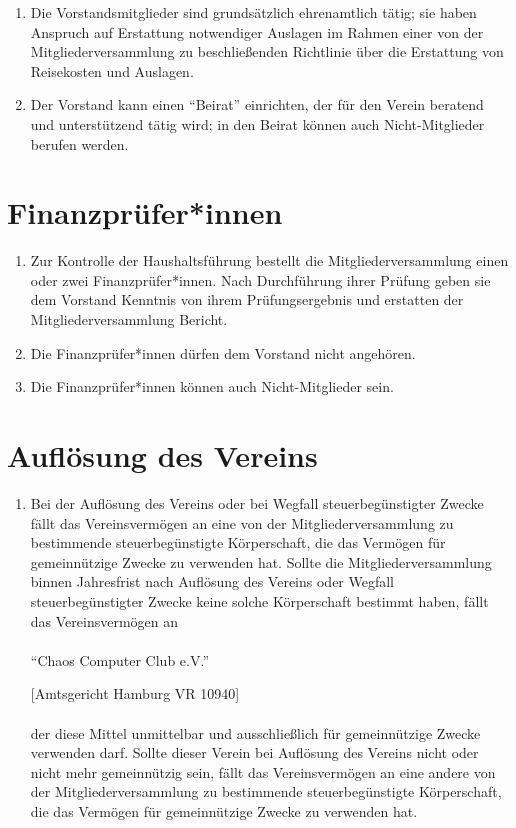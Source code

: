 \documentclass[a4paper]{article}
\begin{document}
\begin{enumerate}
	\item Die Vorstandsmitglieder sind grundsätzlich ehrenamtlich tätig; sie haben Anspruch auf Erstattung notwendiger Auslagen im Rahmen einer von der Mitgliederversammlung zu beschließenden Richtlinie über die Erstattung von Reisekosten und Auslagen.

	\item Der Vorstand kann einen \enquote{Beirat} einrichten, der für den Verein beratend und unterstützend tätig wird; in den Beirat können auch Nicht-Mitglieder berufen werden.

\end{enumerate}

\section{Finanzprüfer*innen}
\begin{enumerate}
	\item Zur Kontrolle der Haushaltsführung bestellt die Mitgliederversammlung einen oder zwei Finanzprüfer*innen. Nach Durchführung ihrer Prüfung geben sie dem Vorstand Kenntnis von ihrem Prüfungsergebnis und erstatten der Mitgliederversammlung Bericht.
	\item Die Finanzprüfer*innen dürfen dem Vorstand nicht angehören.
	\item Die Finanzprüfer*innen können auch Nicht-Mitglieder sein.
\end{enumerate}

\filbreak
\section{Auflösung des Vereins}
\begin{enumerate}
	\item Bei der Auflösung des Vereins oder bei Wegfall steuerbegünstigter Zwecke fällt das Vereinsvermögen an eine von der Mitgliederversammlung zu bestimmende steuerbegünstigte Körperschaft, die das Vermögen für gemeinnützige Zwecke zu verwenden hat. Sollte die Mitgliederversammlung binnen Jahresfrist nach Auflösung des Vereins oder Wegfall steuerbegünstigter Zwecke keine solche Körperschaft bestimmt haben, fällt das Vereinsvermögen an
	 \\
	 \\
	\enquote{Chaos Computer Club e.V.}

	[Amtsgericht Hamburg VR 10940]
	\\
	\\
	der diese Mittel unmittelbar und ausschließlich für gemeinnützige Zwecke verwenden darf. Sollte dieser Verein bei Auflösung des Vereins nicht oder nicht mehr gemeinnützig sein, fällt das Vereinsvermögen an eine andere von der Mitgliederversammlung zu bestimmende steuerbegünstigte Körperschaft, die das Vermögen für gemeinnützige Zwecke zu verwenden hat.
\end{enumerate}
\end{document}
